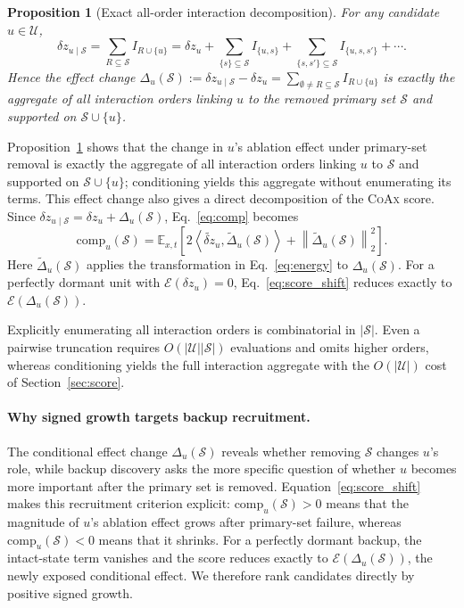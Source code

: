\documentclass{article} %
\theoremstyle{plain}
\newtheorem{proposition}{Proposition}
\theoremstyle{definition}
\newcommand{\coax}{\textsc{CoAx}\xspace}
\newcommand{\comp}{\mathrm{comp}}
\newcommand{\energy}{\mathcal{E}}
\newcommand{\dz}{\delta z}
\newcommand{\Sset}{\mathcal{S}}
\newcommand{\Uset}{\mathcal{U}}
\begin{document}
\begin{proposition}[Exact all-order interaction decomposition]
\label{prop:exact}
For any candidate $u\in\Uset$,
\begin{equation}
\dz_{u\mid\Sset}
=
\sum_{R\subseteq\Sset} I_{R\cup\{u\}}
=
\dz_u
+
\sum_{\{s\}\subseteq\Sset} I_{\{u,s\}} %
+
\sum_{\{s,s'\}\subseteq\Sset} I_{\{u,s,s'\}}
+\cdots .
\label{eq:exact}
\end{equation}
Hence the \emph{effect change}
$\Delta_u(\Sset):=\dz_{u\mid\Sset}-\dz_u
=\sum_{\emptyset\neq R\subseteq\Sset}I_{R\cup\{u\}}$
is exactly the aggregate of all interaction orders linking $u$ to the removed primary set $\Sset$ and supported on $\Sset \cup \{u\}$. %
\end{proposition}

Proposition~\ref{prop:exact} shows that the change in $u$'s ablation effect under primary-set removal is exactly the aggregate of all interaction orders linking $u$ to $\Sset$ and supported on $\Sset \cup \{u\}$; conditioning yields this aggregate without enumerating its terms.
This effect change also gives a direct decomposition of the \coax score.
Since $\dz_{u\mid\Sset}=\dz_u+\Delta_u(\Sset)$, Eq.~\ref{eq:comp} becomes
\begin{equation}
\comp_u(\Sset)
=
\mathbb{E}_{x,t}
\left[
2\left\langle
\widetilde{\dz}_u,
\widetilde{\Delta}_u(\Sset)
\right\rangle
+
\left\|
\widetilde{\Delta}_u(\Sset)
\right\|_2^2
\right].
\label{eq:score_shift}
\end{equation}
Here $\widetilde{\Delta}_u(\Sset)$ applies the transformation in Eq.~\ref{eq:energy} to $\Delta_u(\Sset)$.
For a perfectly dormant unit with $\energy(\dz_u)=0$, Eq.~\ref{eq:score_shift} reduces exactly to $\energy(\Delta_u(\Sset))$.

Explicitly enumerating all interaction orders is combinatorial in $|\Sset|$.
Even a pairwise truncation requires $O(|\Uset||\Sset|)$ evaluations and omits higher orders, whereas conditioning yields the full interaction aggregate with the $O(|\Uset|)$ cost of Section~\ref{sec:score}.

\paragraph{Why signed growth targets backup recruitment.}
The conditional effect change $\Delta_u(\Sset)$ reveals whether removing $\Sset$ changes $u$'s role, while backup discovery asks the more specific question of whether $u$ becomes more important after the primary set is removed.
Equation~\ref{eq:score_shift} makes this recruitment criterion explicit: $\comp_u(\Sset)>0$ means that the magnitude of $u$'s ablation effect grows after primary-set failure, whereas $\comp_u(\Sset)<0$ means that it shrinks.
For a perfectly dormant backup, the intact-state term vanishes and the score reduces exactly to $\energy(\Delta_u(\Sset))$, the newly exposed conditional effect.
We therefore rank candidates directly by positive signed growth.
\end{document}

